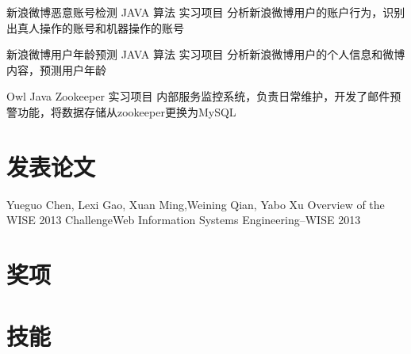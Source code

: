 \documentclass[11pt,a4paper]{moderncv}
\begin{document}
\vspace*{0.2\baselineskip}
{新浪微博恶意账号检测}
{JAVA 算法}
{实习项目}{}
{分析新浪微博用户的账户行为，识别出真人操作的账号和机器操作的账号}

\vspace*{0.2\baselineskip}
{新浪微博用户年龄预测}
{JAVA 算法}
{实习项目}{}
{分析新浪微博用户的个人信息和微博内容，预测用户年龄}

\vspace*{0.2\baselineskip}
{Owl}
{Java Zookeeper}
{实习项目}{}
{内部服务监控系统，负责日常维护，开发了邮件预警功能，将数据存储从zookeeper更换为MySQL}


\renewcommand{\baselinestretch}{1.0}

\section{发表论文}
{\textnormal{Yueguo Chen, Lexi Gao, } Xuan Ming\textnormal{,Weining Qian, Yabo Xu}}
{Overview of the WISE 2013 Challenge}{Web Information Systems Engineering–WISE 2013 }
{}{}{}

\section{奖项}

\section{技能}

\closesection{}                   %
\end{document}

